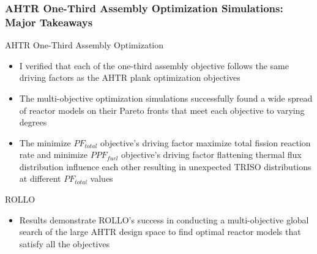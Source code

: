 \begin{frame}
    \frametitle{AHTR One-Third Assembly Optimization Simulations: Major Takeaways}
    \begin{block}{AHTR One-Third Assembly Optimization}
        \begin{itemize}
            \item I verified that each of the one-third assembly objective follows 
            the same driving factors as the AHTR plank optimization objectives
            \item The multi-objective optimization simulations successfully found a 
            wide spread of reactor models on their Pareto fronts that meet each 
            objective to varying degrees
            \item The minimize $PF_{total}$ objective's driving factor maximize 
            total fission reaction rate and minimize $PPF_{fuel}$ objective's driving 
            factor flattening thermal flux distribution influence each other resulting 
            in unexpected TRISO distributions at different $PF_{total}$ values 
        \end{itemize}
    \end{block}
    \begin{block}{ROLLO}
        \begin{itemize}
            \item  Results demonstrate ROLLO's success in conducting a multi-objective 
            global search of the large AHTR design space to find optimal reactor models 
            that satisfy all the objectives
        \end{itemize}
    \end{block}

\end{frame}
